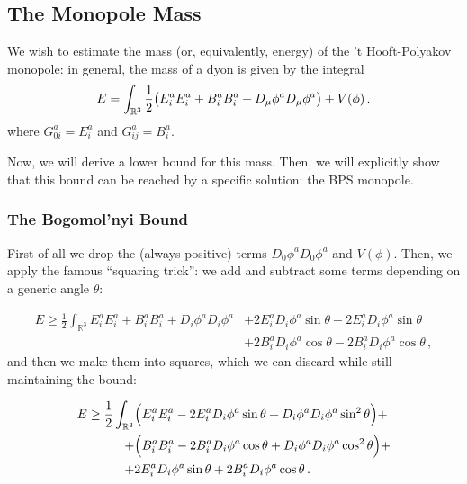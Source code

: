 \documentclass[main.tex]{subfiles}
\begin{document}
\subsection{The Monopole Mass}

We wish to estimate the mass (or, equivalently, energy) of the 't Hooft-Polyakov monopole: in general, the mass of a dyon is given by the integral
%
\begin{equation} \label{eq:monopole-mass}
  E = \int_{\mathbb{R}^3}
  \frac{1}{2} \qty(E_i^a E_i^a + B_i^a B_i^a + D_\mu \phi^a D_\mu \phi^a) + V(\phi)\,.
\end{equation}
%
where \(G_{0i}^a = E_i^a\) and \(G_{ij}^a = B_i^a\).

Now, we will derive a lower bound for this mass. Then, we will explicitly show that this bound can be reached by a specific solution: the BPS monopole.

\subsubsection{The Bogomol'nyi Bound}

First of all we drop the (always positive) terms \(D_0 \phi^a D_0 \phi^a\) and \(V(\phi)\).
Then, we apply the famous ``squaring trick'': we add and subtract some terms depending on a generic angle \(\theta\):

\begin{equation}
\begin{split}
    E \geq \frac{1}{2}  \int_{\mathbb R^3}   E_i^a E_i^a + B_i^a B_i^a + D_i \phi^a D_i \phi^a &+2 E_i^a D_i \phi^a \sin \theta - 2E_i^a D_i \phi^a \sin \theta \\
  &+2 B_i^a D_i \phi^a \cos \theta - 2 B_i^a D_i \phi^a \cos \theta \,,
\end{split}
\end{equation}
%
and then we make them into squares, which we can discard while still maintaining the bound:
%

\begin{equation}
\begin{split}
    E \geq  \frac{1}{2} \int_{\mathbb R^3}
    &\qty(E_i^a E_i^a - 2 E_i^a D_i\phi^a \sin\theta + D_i\phi^a D_i\phi^a \sin^2\theta) + \\
    + &\qty( B_i^a B_i^a - 2 B_i^a D_i\phi^a \cos\theta + D_i\phi^a D_i\phi^a \cos^2\theta) +  \\
    +&2 E_i^a D_i \phi^a \sin \theta+2 B_i^a D_i \phi^a \cos \theta \,.
\end{split}
\end{equation}
\end{document}
